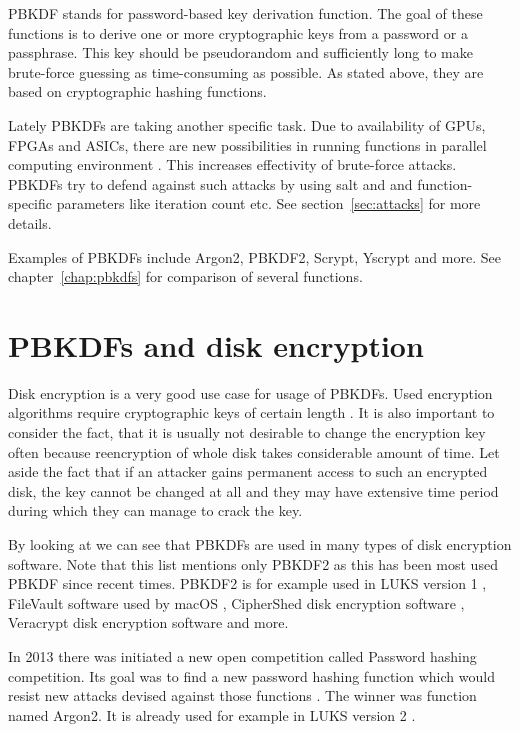 \documentclass[nolof]{fithesis3}
\begin{document}
PBKDF stands for password-based key derivation function. The goal of these functions is to derive one or more cryptographic keys from a password or a passphrase. This key should be pseudorandom and sufficiently long to make brute-force guessing as time-consuming as possible. As stated above, they are based on cryptographic hashing functions.

Lately PBKDFs are taking another specific task. Due to availability of GPUs, FPGAs and ASICs, there are  new possibilities in running functions in parallel computing environment \parencite[see][chapter 4]{mosnacek}. This increases effectivity of brute-force attacks. PBKDFs try to defend against such attacks by using salt and and function-specific parameters like iteration count etc. See section~\ref{sec:attacks} for more details.

Examples of PBKDFs include Argon2, PBKDF2, Scrypt, Yscrypt and more. See chapter~\ref{chap:pbkdfs} for comparison of several functions.

\section{PBKDFs and disk encryption}
Disk encryption is a very good use case for usage of PBKDFs. Used encryption algorithms require cryptographic keys of certain length \parencite{veracrypt}. It is also important to consider the fact, that it is usually not desirable to change the encryption key often because reencryption of whole disk takes considerable amount of time. Let aside the fact that if an attacker gains permanent access to such an encrypted disk, the key cannot be changed at all and they may have extensive time period during which they can manage to crack the key. 

By looking at \parencite{pbkdf2usage} we can see that PBKDFs are used in many types of disk encryption software. Note that this list mentions only PBKDF2 as this has been most used PBKDF since recent times. PBKDF2 is for example used in LUKS version 1 \parencite{luks1}, FileVault software used by macOS \parencite{filevault}, CipherShed disk encryption software \parencite{ciphershed}, Veracrypt disk encryption software \parencite{veracrypt} and more.

In 2013 there was initiated a new open competition called Password hashing competition. Its goal was to find a new password hashing function which would resist new attacks devised against those functions \parencite{phc}. The winner was function named Argon2. It is already used for example in LUKS version 2 \parencite{luks2}.
\end{document}
